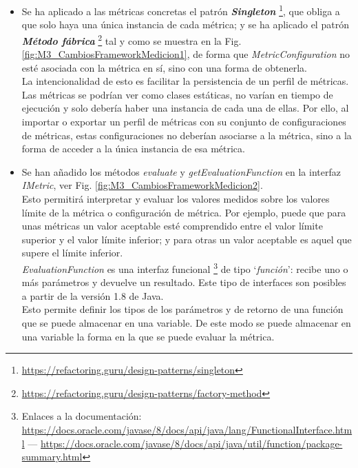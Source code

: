 \begin{itemize}
	\tightlist
	\item Se ha aplicado a las métricas concretas el patrón \textit{\textbf{Singleton}} \footnote{\url{https://refactoring.guru/design-patterns/singleton}}, que obliga a que solo haya una única instancia de cada métrica; y se ha aplicado el patrón \textit{\textbf{Método fábrica}} \footnote{\url{https://refactoring.guru/design-patterns/factory-method}} tal y como se muestra en la Fig. \ref{fig:M3_CambiosFrameworkMedicion1}, de forma que \textit{MetricConfiguration} no esté asociada con la métrica en sí, sino con una forma de obtenerla.\\
	La intencionalidad de esto es facilitar la persistencia de un perfil de métricas. Las métricas se podrían ver como clases estáticas, no varían en tiempo de ejecución y solo debería haber una instancia de cada una de ellas. Por ello, al importar o exportar un perfil de métricas con su conjunto de configuraciones de métricas, estas configuraciones no deberían asociarse a la métrica, sino a la forma de acceder a la única instancia de esa métrica. 
	\item Se han añadido los métodos \textit{evaluate} y \textit{getEvaluationFunction} en la interfaz \textit{IMetric}, ver Fig. \ref{fig:M3_CambiosFrameworkMedicion2}.\\
	Esto permitirá interpretar y evaluar los valores medidos sobre los valores límite de la métrica o configuración de métrica. Por ejemplo, puede que para unas métricas un valor aceptable esté comprendido entre el valor límite superior y el valor límite inferior; y para otras un valor aceptable es aquel que supere el límite inferior.\\
	\textit{EvaluationFunction} es una interfaz funcional \footnote{Enlaces a la documentación: \url{https://docs.oracle.com/javase/8/docs/api/java/lang/FunctionalInterface.html} --- \url{https://docs.oracle.com/javase/8/docs/api/java/util/function/package-summary.html}} 
	de tipo `\textit{función}': recibe uno o más parámetros y devuelve un resultado. Este tipo de interfaces son posibles a partir de la versión 1.8 de Java.\\
	Esto permite definir los tipos de los parámetros y de retorno de una función que se puede almacenar en una variable. De este modo se puede almacenar en una variable la forma en la que se puede evaluar la métrica.
\end{itemize}


